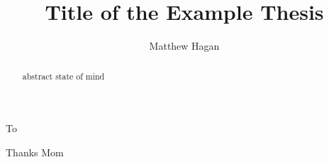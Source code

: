 \documentclass{ut-thesis}
\author{Matthew Hagan}
\title{Title of the Example Thesis}
\begin{document}
  \frontmatter
    \maketitle
    \begin{abstract}
      abstract state of mind
    \end{abstract}
    \begin{dedication}
      To 
    \end{dedication}
    \begin{acknowledgements}
      Thanks Mom
    \end{acknowledgements}
    \tableofcontents
    \listoftables
    \listoffigures
  \mainmatter
    
    
    
    
  \appendix
  \backmatter
  \printbibliography[heading=bibintoc]
\end{document}

